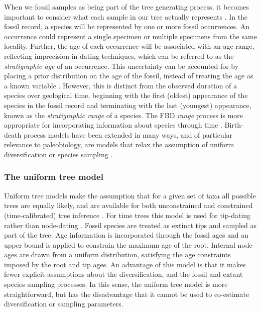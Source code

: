 When we  fossil samples as being part of the tree generating process, it becomes important to consider what each sample in our tree actually represents \citep{Hopkins2018}.
In the fossil record, a species will be represented by one or more fossil occurrences.
An occurrence could represent a single specimen or multiple specimens from the same locality.
Further, the age of each occurrence will be associated with an age range, reflecting imprecision in dating techniques, which can be referred to as the \textit{stratigraphic age} of an occurrence.
This uncertainty can be accounted for by placing a prior distribution on the age of the fossil, instead of treating the age as a known variable \citep{Drummond2016,BaridoSottani2019a}.
However, this is distinct from the observed duration of a species over geological time, beginning with the first (oldest) appearance of the species in the fossil record and terminating with the last (youngest) appearance, known as the \textit{stratigraphic range} of a species.
The FBD \textit{range} process is more appropriate for incorporating information about species through time \citep{Stadler2018}.
Birth-death process models have been extended in many ways, and of particular relevance to paleobiology,  are models that relax the assumption of uniform diversification or species sampling \citep{Hoehna2011,Stadler2013b,Gavryushkina2014,Zhang2016,Kuehnert2016,BaridoSottani2018}.

\subsubsection{The uniform tree model}

Uniform tree models make the assumption that for a given set of taxa all possible trees are equally likely, and are available for both unconstrained and constrained (time-calibrated) tree inference \citep{Huelsenbeck2001a,Ronquist2012a}.
For time trees this model is used for tip-dating rather than node-dating \citep{Ronquist2012a}.
Fossil species are treated as extinct tips and sampled as part of the tree.
Age information is incorporated through the fossil ages and an upper bound is applied to constrain the maximum age of the root.
Internal node ages are drawn from a uniform distribution, satisfying the age constraints imposed by the root and tip ages.
An advantage of this model is that it makes fewer explicit assumptions about the diversification, and the fossil and extant species sampling processes.
In this sense, the  uniform tree model is more straightforward, but has the disadvantage that it cannot be used to co-estimate diversification or sampling parameters.

